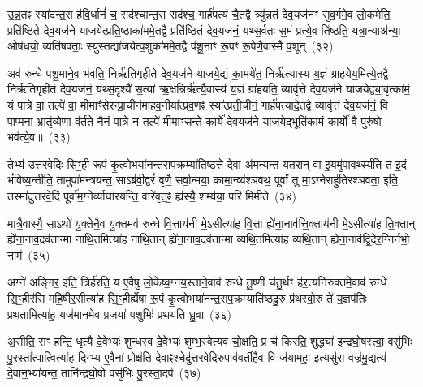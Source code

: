 उ॒न्न॒तꣴ स्या॑दन्त॒रा ह॑वि॒र्धानं॑ च॒ सद॑श्चान्त॒रा सद॑श्च॒ गार्\mbox{}ह॑पत्यं चै॒तद्वै त्र्यु॑न्नतं देव॒यज॑नꣳ सुव॒र्गमे॒व लो॒कमे॑ति॒ प्रति॑ष्ठिते देव॒यज॑ने याजयेत्प्रति॒ष्ठाका॑ममे॒तद्वै प्रति॑ष्ठितं देव॒यज॑नं॒ यथ्स॒र्वतः॑ स॒मं प्रत्ये॒व ति॑ष्ठति॒ यत्रा॒न्याअ॑न्या॒ ओष॑धयो॒ व्यति॑षक्ताः॒ स्युस्तद्या॑जयेत्प॒शुका॑ममे॒तद्वै प॑शू॒नाꣳ रू॒पꣳ रू॒पेणै॒वास्मै॑ प॒शून्~(३२)\ip

अव॑ रुन्धे पशु॒माने॒व भ॑वति॒ निर्\mbox{}ऋ॑तिगृहीते देव॒यज॑ने याजये॒द्यं का॒मये॑त॒ निर्\mbox{}ऋ॑त्यास्य य॒ज्ञं ग्रा॑हयेय॒मित्ये॒तद्वै निर्\mbox{}ऋ॑तिगृहीतं देव॒यज॑नं॒ यथ्स॒दृश्यै॑ स॒त्या॑ ऋ॒क्षन्निर्\mbox{}ऋ॑त्यै॒वास्य॑ य॒ज्ञं ग्रा॑हयति॒ व्यावृ॑त्ते देव॒यज॑ने याजयेद्व्या॒वृत्का॑मं॒ यं पात्रे॑ वा॒ तल्पे॑ वा॒ मीमाꣳ॑सेरन्प्रा॒चीन॑माहव॒नीया᳚त्प्रव॒णꣴ स्या᳚त्प्रती॒चीनं॒ गार्\mbox{}ह॑पत्यादे॒तद्वै व्यावृ॑त्तं देव॒यज॑नं॒ वि पा॒प्मना॒ भ्रातृ॑व्ये॒णा व॑र्तते॒ नैनं॒ पात्रे॒ न तल्पे॑ मीमाꣳसन्ते का॒र्ये॑ देव॒यज॑ने याजये॒द्भूति॑कामं का॒र्यो॑ वै पुरु॑षो॒ भव॑त्ये॒व॥~(३३)\ip

{\anuvakamend[{यात॒वै ह॑वि॒र्धान॑ञ्च प॒शून्पा॒प्मना॒\-ऽष्टाद॑श च}]}

तेभ्य॑ उत्तरवे॒दिः सि॒ꣳ॒ही रू॒पं कृ॒त्वोभया॑नन्त॒राप॒क्रम्या॑तिष्ठ॒त्ते दे॒वा अ॑मन्यन्त यत॒रान् वा इ॒यमु॑पाव॒र्थ्स्यति॒ त इ॒दं भं॑विष्य॒न्तीति॒ तामुपा॑मन्त्रयन्त॒ साऽब्र॑वी॒द्वरं॑ वृणै॒ सर्वा॒न्मया॒ कामा॒न्व्य॑श्ञवथ॒ पूर्वां तु मा॒\-ऽग्नेराहु॑तिरश्ञवता॒ इति॒ तस्मा॑दुत्तरवे॒दिं पूर्वा॑म॒ग्नेर्व्याघा॑रयन्ति॒ वारे॑वृत॒ꣴ॒ ह्य॑स्यै॒ शम्य॑या॒ परि॑ मिमीते~(३४)\ip

मात्रै॒वास्यै॒ सा\-ऽथो॑ यु॒क्तेनै॒व यु॒क्तमव॑ रुन्धे वि॒त्ताय॑नी मे॒\-ऽसीत्या॑ह वि॒त्ता ह्ये॑ना॒नाव॑त्ति॒क्ताय॑नी मे॒\-ऽसीत्या॑ह ति॒क्तान् ह्ये॑ना॒नाव॒दव॑तान्मा नाथि॒तमित्या॑ह नाथि॒तान् ह्ये॑ना॒नाव॒दव॑तान्मा व्यथि॒तमित्या॑ह व्यथि॒तान् ह्ये॑ना॒नाव॑द्वि॒देर॒ग्निर्नभो॒ नाम॑~(३५)\ip

अग्ने॑ अङ्गिर॒ इति॒ त्रिर्\mbox{}ह॑रति॒ य ए॒वैषु लो॒केष्व॒ग्नय॒स्ताने॒वाव॑ रुन्धे तू॒ष्णीं च॑तु॒र्थꣳ ह॑र॒त्यनि॑रुक्तमे॒वाव॑ रुन्धे सि॒ꣳ॒हीर॑सि महि॒षीर॒सीत्या॑ह सि॒ꣳ॒हीर्\mbox{}ह्ये॑षा रू॒पं कृ॒त्वोभया॑नन्त॒राप॒क्रम्याति॑ष्ठदु॒रु प्र॑थस्वो॒रु ते॑ य॒ज्ञप॑तिः प्रथता॒मित्या॑ह॒ यज॑मानमे॒व प्र॒जया॑ प॒शुभिः॑ प्रथयति ध्रु॒वा~(३६)\ip

अ॒सीति॒ सꣳ ह॑न्ति॒ धृत्यै॑ दे॒वेभ्यः॑ शुन्धस्व दे॒वेभ्यः॑ शुम्भ॒स्वेत्यव॑ चो॒क्षति॒ प्र च॑ किरति॒ शुद्ध्या॑ इन्द्रघो॒षस्त्वा॒ वसु॑भिः पु॒रस्ता᳚त्पा॒त्वित्या॑ह दि॒ग्भ्य ए॒वैनां॒ प्रोक्ष॑ति दे॒वाꣴश्चेदु॑त्तरवे॒दिरु॒पाव॑वर्ती॒हैव वि ज॑यामहा॒ इत्यसु॑रा॒ वज्र॑मु॒द्यत्य॑ दे॒वान॒भ्या॑यन्त॒ तानि॑न्द्रघो॒षो वसु॑भिः पु॒रस्ता॒दप॑~(३७)\ip

